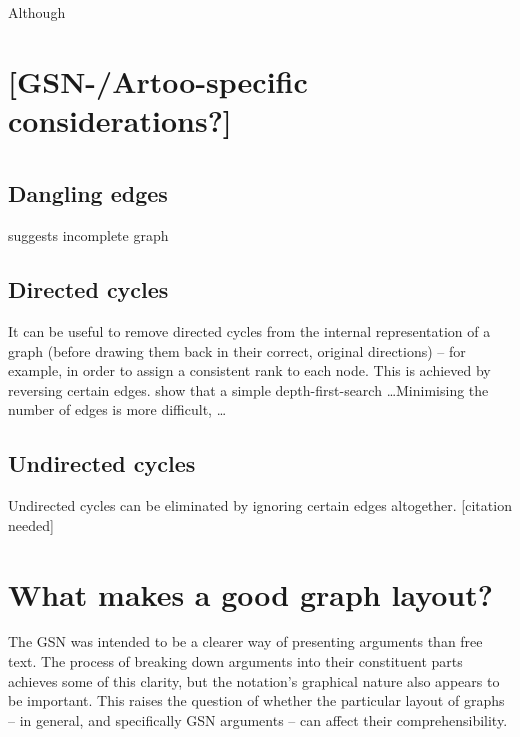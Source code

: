 \begin{itemize*}
Although 



\section{[GSN-/Artoo-specific considerations?]}


\section{}



\subsection{Dangling edges}

suggests incomplete graph



\subsection{Directed cycles}

It can be useful to remove directed cycles from the internal representation of a graph
(before drawing them back in their correct, original directions)
-- for example, in order to assign a consistent rank to each node.
This is achieved by reversing certain edges.
\citet{gansner1993} show that a simple depth-first-search \ldots  Minimising the number of edges is more difficult, \citeauthor{gansner1993} \ldots



\subsection{Undirected cycles}

Undirected cycles can be eliminated by ignoring certain edges altogether.  [citation needed]



\section{What makes a good graph layout?}

The GSN was intended to be a clearer way of presenting arguments than free text.
The process of breaking down arguments into their constituent parts achieves some of this clarity,
but the notation's graphical nature also appears to be important.
This raises the question of whether the particular layout of graphs -- in general, and specifically GSN arguments -- can affect their comprehensibility.


\end{itemize*}
